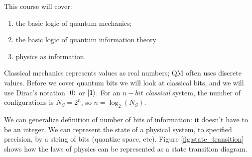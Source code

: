 \documentclass[]{article}
\begin{document}
This course will cover:
\begin{enumerate}
	\item the basic logic of quantum mechanics;
	\item the basic logic of quantum information theory
	\item physics as information.
\end{enumerate}

Classical mechanics represents values as real numbers; QM often uses discrete values. Before we cover quantum bits we will look at classical bits, and we will use Dirac's notation\cite{susskind2014quantum} $\ket{0}$ or $\ket{1}$\cite{susskind2014quantum}. For an $n-bit$ \emph{classical} system, the number of configurations is $N_S=2^n$, so $n=\log_2(N_S)$.

We can generalize definition of number of bits of information: it doesn't have to be an integer. We can represent the state of a physical system, to specified precision, by a string of bits (quantize space, etc). Figure \ref{fig:state_transition} shows how the laws of physics can be represented as a state transition diagram.
\end{document}
